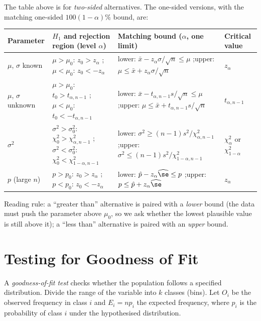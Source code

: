 The table above is for \emph{two-sided} alternatives. The one-sided versions, with the matching one-sided $100(1-\alpha)\%$ bound, are:

\begin{center}
\small
\begin{tabular}{p{2.2cm}p{3.5cm}p{3.5cm}p{3.5cm}}
\toprule
Parameter & $H_1$ and rejection region (level $\alpha$) & Matching bound ($\alpha$, one limit) & Critical value \\
\midrule
$\mu$, $\sigma$ known & $\mu>\mu_0$: $z_0>z_\alpha$ ;\quad $\mu<\mu_0$: $z_0<-z_\alpha$ & lower: $\bar{x}-z_\alpha\sigma/\sqrt n\le\mu$ ;\quad upper: $\mu\le\bar{x}+z_\alpha\sigma/\sqrt n$ & $z_\alpha$ \\
$\mu$, $\sigma$ unknown & $\mu>\mu_0$: $t_0>t_{\alpha,n-1}$ ;\quad $\mu<\mu_0$: $t_0<-t_{\alpha,n-1}$ & lower: $\bar{x}-t_{\alpha,n-1}s/\sqrt n\le\mu$ ;\quad upper: $\mu\le\bar{x}+t_{\alpha,n-1}s/\sqrt n$ & $t_{\alpha,n-1}$ \\
$\sigma^2$ & $\sigma^2>\sigma_0^2$: $\chi_0^2>\chi^2_{\alpha,n-1}$ ;\quad $\sigma^2<\sigma_0^2$: $\chi_0^2<\chi^2_{1-\alpha,n-1}$ & lower: $\sigma^2\ge(n-1)s^2/\chi^2_{\alpha,n-1}$ ;\quad upper: $\sigma^2\le(n-1)s^2/\chi^2_{1-\alpha,n-1}$ & $\chi^2_{\alpha}$ or $\chi^2_{1-\alpha}$ \\
$p$ (large $n$) & $p>p_0$: $z_0>z_\alpha$ ;\quad $p<p_0$: $z_0<-z_\alpha$ & lower: $\hat{p}-z_\alpha\widehat{\se}\le p$ ;\quad upper: $p\le\hat{p}+z_\alpha\widehat{\se}$ & $z_\alpha$ \\
\bottomrule
\end{tabular}
\end{center}

Reading rule: a ``greater than'' alternative is paired with a \emph{lower} bound (the data must push the parameter above $\mu_0$, so we ask whether the lowest plausible value is still above it); a ``less than'' alternative is paired with an \emph{upper} bound.

\section{Testing for Goodness of Fit}

A \emph{goodness-of-fit test} checks whether the population follows a specified distribution. Divide the range of the variable into $k$ classes (bins). Let $O_i$ be the observed frequency in class $i$ and $E_i=np_i$ the expected frequency, where $p_i$ is the probability of class $i$ under the hypothesised distribution.

